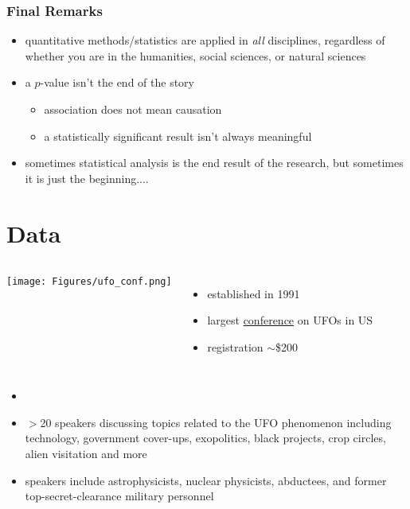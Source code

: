 \begin{frame}
\frametitle{Final Remarks}
\begin{itemize}
    \item
    quantitative methods/statistics are applied in \emph{all} disciplines, regardless of whether you are in the humanities, social sciences, or natural sciences
    \item
    a $p$-value isn't the end of the story
    \begin{itemize}
        \item
        association does not mean causation
        \item
        a statistically significant result isn't always meaningful
    \end{itemize}
    \item
    sometimes statistical analysis is the end result of the research, but sometimes it is just the beginning....
\end{itemize}
\end{frame}




\section[Data]{Data}
\begin{frame}
\end{frame}

\begin{frame}
\begin{columns}
\texttt{[image: Figures/ufo\_conf.png]}\\
\begin{itemize}
    \item
   established in 1991
   \item
   largest \href{http://ufocongress.com/}{conference} on UFOs in US
   \item
   registration $\sim$\$200
\end{itemize}
\end{columns}
\begin{itemize}
\item[]
    \item
   $>$20 speakers discussing topics related to the UFO phenomenon including technology, government cover-ups, exopolitics, black projects, crop circles, alien visitation and more
   \item
   speakers include astrophysicists, nuclear physicists, abductees, and former top-secret-clearance military personnel
\end{itemize}
\end{frame}

